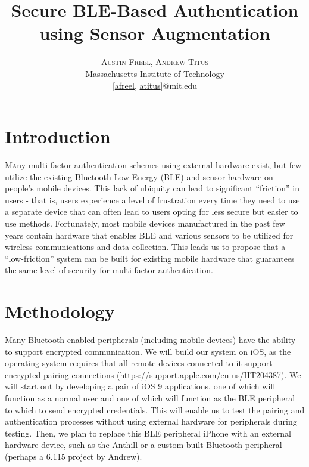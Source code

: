 \documentclass[twoside]{article}
\title{\vspace{-15mm}\fontsize{24pt}{10pt}\selectfont\textbf{Secure BLE-Based Authentication using Sensor Augmentation}}
\author{
\large
\textsc{Austin Freel, Andrew Titus}\\[2mm] %
\normalsize Massachusetts Institute of Technology \\ %
\normalsize [\href{mailto:afreel@mit.edu}{afreel}, \href{mailto:atitus@mit.edu}{atitus}]@mit.edu %
\vspace{-5mm}
}
\date{}
\begin{document}
\maketitle %

\thispagestyle{fancy} %


\begin{multicols}{2} %

\section{Introduction}

\lettrine[nindent=0em,lines=3]{M}any multi-factor authentication schemes using external
hardware exist, but few utilize the existing Bluetooth Low Energy (BLE) and sensor hardware
on people's mobile devices. This lack of ubiquity can lead to significant ``friction'' in
users - that is, users experience a level of frustration every time they need to use a
separate device that can often lead to users opting for less secure but easier to use methods.
Fortunately, most mobile devices manufactured in the past few years contain hardware that
enables BLE and various sensors to be utilized for wireless communications and data collection.
This leads us to propose that a ``low-friction'' system can be built for existing mobile
hardware that guarantees the same level of security for multi-factor authentication.


\section{Methodology}

Many Bluetooth-enabled peripherals (including mobile devices) have the ability to support
encrypted communication. We will build our system on iOS, as the operating system requires
that all remote devices connected to it support encrypted pairing connections
(https://support.apple.com/en-us/HT204387). We will start out by developing a pair of iOS
9 applications, one of which will function as a normal user and one of which will function
as the BLE peripheral to which to send encrypted credentials. This will enable us to test
the pairing and authentication processes without using external hardware for peripherals
during testing. Then, we plan to replace this BLE peripheral iPhone with an external
hardware device, such as the Anthill or a custom-built Bluetooth peripheral (perhaps
a 6.115 project by Andrew).


\end{multicols}
\end{document}
